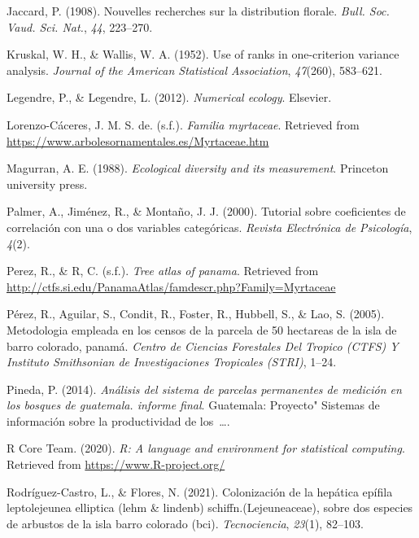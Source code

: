 \documentclass[11pt,]{article}
\begin{document}
\hypertarget{ref-jaccard1908nouvelles}{}
Jaccard, P. (1908). Nouvelles recherches sur la distribution florale.
\emph{Bull. Soc. Vaud. Sci. Nat.}, \emph{44}, 223--270.

\hypertarget{ref-kruskal1952use}{}
Kruskal, W. H., \& Wallis, W. A. (1952). Use of ranks in one-criterion
variance analysis. \emph{Journal of the American Statistical
Association}, \emph{47}(260), 583--621.

\hypertarget{ref-legendre2012numerical}{}
Legendre, P., \& Legendre, L. (2012). \emph{Numerical ecology}.
Elsevier.

\hypertarget{ref-josemyrtaceae}{}
Lorenzo-Cáceres, J. M. S. de. (s.f.). \emph{Familia myrtaceae}.
Retrieved from \url{https://www.arbolesornamentales.es/Myrtaceae.htm}

\hypertarget{ref-magurran1988ecological}{}
Magurran, A. E. (1988). \emph{Ecological diversity and its measurement}.
Princeton university press.

\hypertarget{ref-palmer2000tutorial}{}
Palmer, A., Jiménez, R., \& Montaño, J. J. (2000). Tutorial sobre
coeficientes de correlación con una o dos variables categóricas.
\emph{Revista Electrónica de Psicología}, \emph{4}(2).

\hypertarget{ref-pereztree}{}
Perez, R., \& R, C. (s.f.). \emph{Tree atlas of panama}. Retrieved from
\url{http://ctfs.si.edu/PanamaAtlas/famdescr.php?Family=Myrtaceae}

\hypertarget{ref-perez2005metodologia}{}
Pérez, R., Aguilar, S., Condit, R., Foster, R., Hubbell, S., \& Lao, S.
(2005). Metodologia empleada en los censos de la parcela de 50 hectareas
de la isla de barro colorado, panamá. \emph{Centro de Ciencias
Forestales Del Tropico (CTFS) Y Instituto Smithsonian de Investigaciones
Tropicales (STRI)}, 1--24.

\hypertarget{ref-pineda2014analisis}{}
Pineda, P. (2014). \emph{Análisis del sistema de parcelas permanentes de
medición en los bosques de guatemala. informe final}. Guatemala:
Proyecto" Sistemas de información sobre la productividad de
los~\ldots{}.

\hypertarget{ref-R2020ALanguage}{}
R Core Team. (2020). \emph{R: A language and environment for statistical
computing}. Retrieved from \url{https://www.R-project.org/}

\hypertarget{ref-rodriguez2021colonizacion}{}
Rodríguez-Castro, L., \& Flores, N. (2021). Colonización de la hepática
epífila leptolejeunea elliptica (lehm \& lindenb)
schiffn.(Lejeuneaceae), sobre dos especies de arbustos de la isla barro
colorado (bci). \emph{Tecnociencia}, \emph{23}(1), 82--103.
\end{document}
